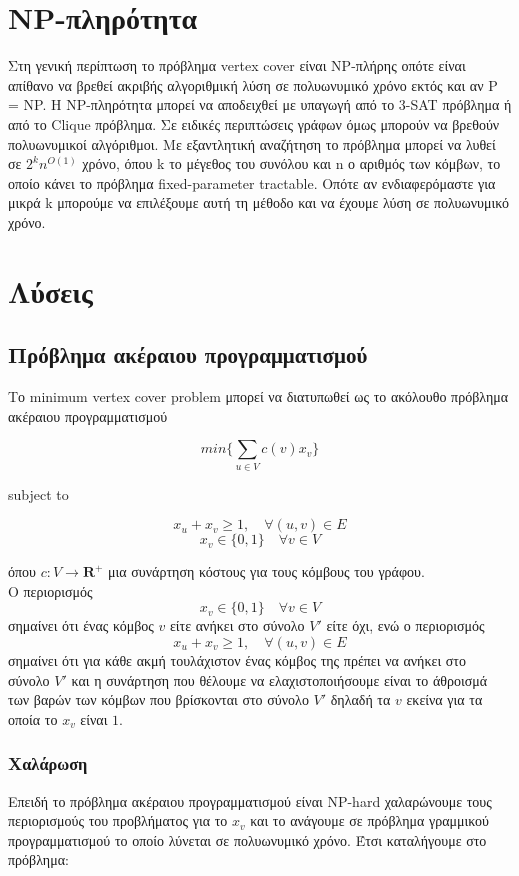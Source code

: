 \section{NP-πληρότητα}

Στη γενική περίπτωση το πρόβλημα vertex cover είναι NP-πλήρης οπότε είναι απίθανο να βρεθεί ακριβής αλγοριθμική λύση σε πολυωνυμικό χρόνο εκτός και αν P = NP. H NP-πληρότητα μπορεί να αποδειχθεί με υπαγωγή από το 3-SAT πρόβλημα ή από το Clique πρόβλημα. Σε ειδικές περιπτώσεις γράφων όμως μπορούν να βρεθούν πολυωνυμικοί αλγόριθμοι. Με εξαντλητική αναζήτηση το πρόβλημα μπορεί να λυθεί σε $2^{k}n^{O(1)}$ χρόνο, όπου k το μέγεθος του συνόλου και n ο αριθμός των κόμβων, το οποίο κάνει το πρόβλημα fixed-parameter tractable. Οπότε αν ενδιαφερόμαστε για μικρά k μπορούμε να επιλέξουμε αυτή τη μέθοδο και να έχουμε λύση σε πολυωνυμικό χρόνο.

\section{Λύσεις}

\subsection{Πρόβλημα ακέραιου προγραμματισμού}

Το minimum vertex cover problem μπορεί να διατυπωθεί ως το ακόλουθο πρόβλημα ακέραιου προγραμματισμού

$$min\{\displaystyle\sum_{u\in{V}} c(v)x_v\}$$ 
\centerline{subject to}
$$x_u + x_v \geq{1}, \quad \forall (u, v) \in{E}$$
$$ x_v \in{\{0, 1\}} \quad \forall v \in{V}$$

όπου $c : V \rightarrow {\boldsymbol{R}^+}$ μια συνάρτηση κόστους για τους κόμβους του γράφου.\\
Ο περιορισμός $$ x_v \in{\{0, 1\}} \quad \forall v \in{V}$$ σημαίνει ότι ένας κόμβος $v$ είτε ανήκει στο σύνολο $V'$ είτε όχι,
ενώ ο περιορισμός $$x_u + x_v \geq{1}, \quad \forall (u, v) \in{E}$$ σημαίνει ότι για κάθε ακμή τουλάχιστον ένας κόμβος της πρέπει να ανήκει στο σύνολο $V'$
και η συνάρτηση που θέλουμε να ελαχιστοποιήσουμε είναι το άθροισμά των βαρών των κόμβων που βρίσκονται στο σύνολο $V'$ δηλαδή τα $v$ εκείνα για τα οποία το $x_v$ είναι $1$.

\subsubsection{Χαλάρωση}

Επειδή το πρόβλημα ακέραιου προγραμματισμού είναι NP-hard χαλαρώνουμε τους περιορισμούς του προβλήματος για το $x_v$ και το ανάγουμε σε πρόβλημα γραμμικού προγραμματισμού το οποίο λύνεται σε πολυωνυμικό χρόνο. Έτσι καταλήγουμε στο πρόβλημα:

